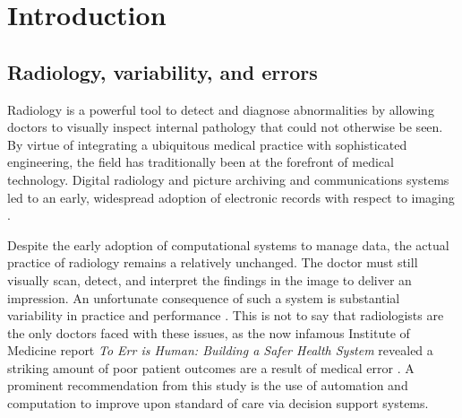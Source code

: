\chapter{Introduction}

\section{Radiology, variability, and errors}
Radiology is a powerful tool to detect and diagnose abnormalities by allowing doctors to visually inspect internal pathology that could not otherwise be seen. By virtue of integrating a ubiquitous medical practice with sophisticated engineering, the field has traditionally been at the forefront of medical technology. Digital radiology and picture archiving and communications systems led to an early, widespread adoption of electronic records with respect to imaging \cite{Strickland:2000cv,Bryan:1999kn}.

Despite the early adoption of computational systems to manage data, the actual practice of radiology remains a relatively unchanged. The doctor must still visually scan, detect, and interpret the findings in the image to deliver an impression. An unfortunate consequence of such a system is substantial variability in practice and performance \cite{Robinson:1997uq,Fitzgerald:2001hn}. This is not to say that radiologists are the only doctors faced with these issues, as the now infamous Institute of Medicine report \emph{To Err is Human: Building a Safer Health System} revealed a striking amount of poor patient outcomes are a result of medical error \cite{Anonymous:2000va}. A prominent recommendation from this study is the use of automation and computation to improve upon standard of care via decision support systems.

